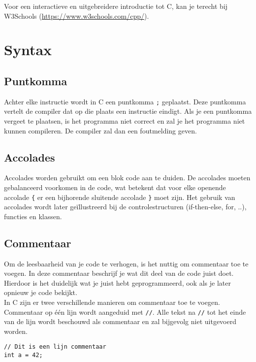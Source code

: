 \documentclass[11pt,fleqn]{book} %
\def\Cpp{{C\nolinebreak[4]\hspace{-.05em}\raisebox{.4ex}{\tiny\bf ++}}}
\begin{document}
\noindent Voor een interactieve en uitgebreidere introductie tot \Cpp, kan je terecht bij W3Schools (\url{https://www.w3schools.com/cpp/}).


\section{Syntax}
\subsection{Puntkomma}
Achter elke instructie wordt in \Cpp{} een puntkomma \texttt{;} geplaatst. Deze puntkomma vertelt de compiler dat op die plaats een instructie eindigt. Als je een puntkomma vergeet te plaatsen, is het programma niet correct en zal je het programma niet kunnen compileren. De compiler zal dan een foutmelding geven.

\subsection{Accolades}
Accolades \texttt{{}} worden gebruikt om een blok code aan te duiden. De accolades moeten gebalanceerd voorkomen in de code, wat betekent dat voor elke openende accolade \texttt{\{} er een bijhorende sluitende accolade \texttt{\}} moet zijn. Het gebruik van accolades wordt later geïllustreerd bij de controlestructuren (if-then-else, for, ..), functies en klassen.

\subsection{Commentaar}
Om de leesbaarheid van je code te verhogen, is het nuttig om commentaar toe te voegen. In deze commentaar beschrijf je wat dit deel van de code juist doet. Hierdoor is het duidelijk wat je juist hebt geprogrammeerd, ook als je later opnieuw je code bekijkt.\\

\noindent In \Cpp{} zijn er twee verschillende manieren om commentaar toe te voegen.\\
Commentaar op één lijn wordt aangeduid met \texttt{//}. Alle tekst na \texttt{//} tot het einde van de lijn wordt beschouwd als commentaar en zal bijgevolg niet uitgevoerd worden. 

\begin{example}[Commentaarlijn]
	\phantom{ }
	\begin{verbatim}
// Dit is een lijn commentaar
int a = 42;
	\end{verbatim}
\end{example}
\end{document}
